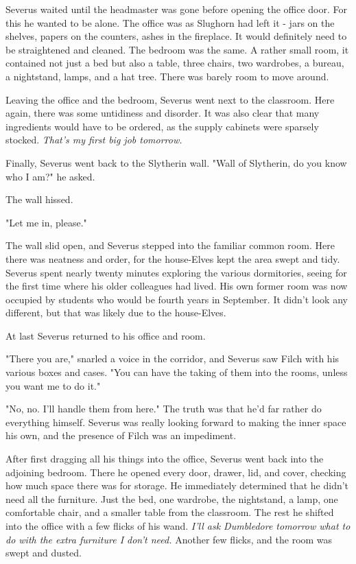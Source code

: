 \documentclass[a4paper,11pt]{article}
\begin{document}
Severus waited until the headmaster was gone before opening the office door. For this he wanted to be alone. The office was as Slughorn had left it - jars on the shelves, papers on the counters, ashes in the fireplace. It would definitely need to be straightened and cleaned. The bedroom was the same. A rather small room, it contained not just a bed but also a table, three chairs, two wardrobes, a bureau, a nightstand, lamps, and a hat tree. There was barely room to move around.

Leaving the office and the bedroom, Severus went next to the classroom. Here again, there was some untidiness and disorder. It was also clear that many ingredients would have to be ordered, as the supply cabinets were sparsely stocked. \emph{That's my first big job tomorrow.}

Finally, Severus went back to the Slytherin wall. "Wall of Slytherin, do you know who I am?" he asked.

The wall hissed.

"Let me in, please."

The wall slid open, and Severus stepped into the familiar common room. Here there was neatness and order, for the house-Elves kept the area swept and tidy. Severus spent nearly twenty minutes exploring the various dormitories, seeing for the first time where his older colleagues had lived. His own former room was now occupied by students who would be fourth years in September. It didn't look any different, but that was likely due to the house-Elves.

At last Severus returned to his office and room.

"There you are," snarled a voice in the corridor, and Severus saw Filch with his various boxes and cases. "You can have the taking of them into the rooms, unless you want me to do it."

"No, no. I'll handle them from here." The truth was that he'd far rather do everything himself. Severus was really looking forward to making the inner space his own, and the presence of Filch was an impediment.

After first dragging all his things into the office, Severus went back into the adjoining bedroom. There he opened every door, drawer, lid, and cover, checking how much space there was for storage. He immediately determined that he didn't need all the furniture. Just the bed, one wardrobe, the nightstand, a lamp, one comfortable chair, and a smaller table from the classroom. The rest he shifted into the office with a few flicks of his wand. \emph{I'll ask Dumbledore tomorrow what to do with the extra furniture I don't need.} Another few flicks, and the room was swept and dusted.
\end{document}
